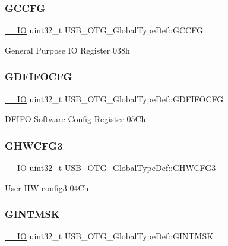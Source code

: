 \subsubsection{\texorpdfstring{GCCFG}{GCCFG}}
{\footnotesize\ttfamily \mbox{\hyperlink{core__sc300_8h_aec43007d9998a0a0e01faede4133d6be}{\+\_\+\+\_\+\+IO}} uint32\+\_\+t U\+S\+B\+\_\+\+O\+T\+G\+\_\+\+Global\+Type\+Def\+::\+G\+C\+C\+FG}

General Purpose IO Register 038h \mbox{\label{struct_u_s_b___o_t_g___global_type_def_a03a213a5cf7e94f475860ae4d7615a23}} 
\subsubsection{\texorpdfstring{GDFIFOCFG}{GDFIFOCFG}}
{\footnotesize\ttfamily \mbox{\hyperlink{core__sc300_8h_aec43007d9998a0a0e01faede4133d6be}{\+\_\+\+\_\+\+IO}} uint32\+\_\+t U\+S\+B\+\_\+\+O\+T\+G\+\_\+\+Global\+Type\+Def\+::\+G\+D\+F\+I\+F\+O\+C\+FG}

D\+F\+I\+FO Software Config Register 05Ch \mbox{\label{struct_u_s_b___o_t_g___global_type_def_a4d0af4dfa531b5fcc09a421399963aaa}} 
\subsubsection{\texorpdfstring{GHWCFG3}{GHWCFG3}}
{\footnotesize\ttfamily \mbox{\hyperlink{core__sc300_8h_aec43007d9998a0a0e01faede4133d6be}{\+\_\+\+\_\+\+IO}} uint32\+\_\+t U\+S\+B\+\_\+\+O\+T\+G\+\_\+\+Global\+Type\+Def\+::\+G\+H\+W\+C\+F\+G3}

User HW config3 04Ch \mbox{\label{struct_u_s_b___o_t_g___global_type_def_a42668fa352b82eb13164a99664956271}} 
\subsubsection{\texorpdfstring{GINTMSK}{GINTMSK}}
{\footnotesize\ttfamily \mbox{\hyperlink{core__sc300_8h_aec43007d9998a0a0e01faede4133d6be}{\+\_\+\+\_\+\+IO}} uint32\+\_\+t U\+S\+B\+\_\+\+O\+T\+G\+\_\+\+Global\+Type\+Def\+::\+G\+I\+N\+T\+M\+SK}

